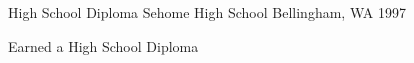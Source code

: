 \begin{cventries}
  \cventry
    {High School Diploma}
    {Sehome High School}
    {Bellingham, WA}
    {1997}
    {
      \begin{cvitems}
        \item {Earned a High School Diploma}
      \end{cvitems}
    }
    \end{cventries}
